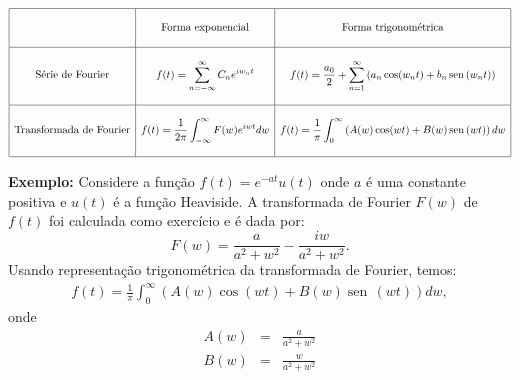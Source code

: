 \documentclass[a4paper,10pt]{book}
\newcommand{\sen}{\operatorname{sen}\,}
\begin{document}
 \begin{equation}
 \begin{array}{|c|c|c|}
 \hline &&\\
 &\hbox{Forma exponencial}&\hbox{Forma trigonométrica}\\&&\\  \hline &&\\
 \hbox{Série de Fourier}&\displaystyle f(t)=\sum_{n=-\infty}^\infty C_n e^{i w_n t} & \displaystyle  f(t)=\frac{a_0}{2}+\sum_{n=1}^\infty\left( a_n \cos(w_nt)+b_n\sen(w_nt)\right)   \\&&\\\hline &&\\
 \hbox{Transformada de Fourier} &\displaystyle f(t)=\frac{1}{2\pi}\int_{-\infty}^\infty F(w)e^{iwt}dw &\displaystyle f(t)=\frac{1}{\pi}\int_{0}^\infty \left( A(w)\cos(wt)+ B(w)\sen(wt)\right)dw \\   &&\\\hline
 \end{array}
 \end{equation}

 {\bf Exemplo:} Considere a função $f(t)=e^{-at}u(t)$ onde $a$ é uma constante positiva e $u(t)$ é a função Heaviside. A transformada de Fourier $F(w)$ de $f(t)$ foi calculada como exercício e é dada por:
 \begin{equation*}
 F(w)=\frac{a}{a^2+w^2}-\frac{iw}{a^2+w^2}.
 \end{equation*}
 Usando representação trigonométrica da transformada de Fourier, temos:
 \begin{eqnarray*}
 f(t)=\frac{1}{\pi}\int_{0}^\infty\left( A(w)\cos(wt)+ B(w)\sen(wt)\right)dw,
 \end{eqnarray*}
 onde
 \begin{eqnarray*}
 A(w)&=&\frac{a}{a^2+w^2}\\
 B(w)&=&\frac{w}{a^2+w^2}
 \end{eqnarray*}

 
\end{document}
